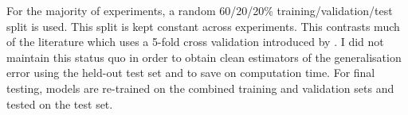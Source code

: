 For the majority of experiments, a random 60/20/20\% training/validation/test split is used. This split is kept constant across experiments. This contrasts much of the literature which uses a 5-fold cross validation introduced by \citet{FourTimelyInsights}. I did not maintain this status quo in order to obtain clean estimators of the generalisation error using the held-out test set and to save on computation time. For final testing, models are re-trained on the combined training and validation sets and tested on the test set.